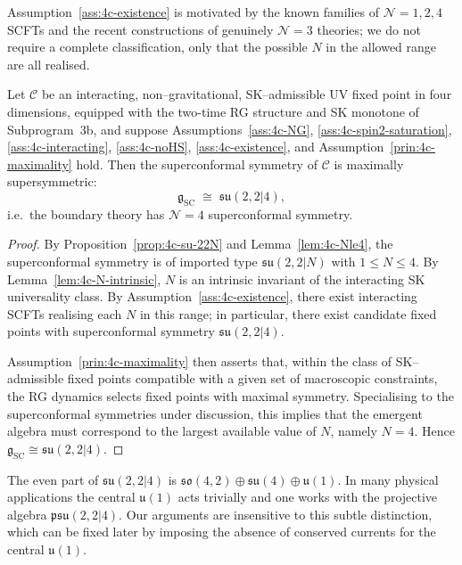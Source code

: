 Assumption~\ref{ass:4c-existence} is motivated by the known families of
$\mathcal N=1,2,4$ SCFTs and the recent constructions of genuinely
$\mathcal N=3$ theories; we do not require a complete classification,
only that the possible $N$ in the allowed range are all realised.

\begin{proposition}[Maximal supersymmetry: \(N=4\)]
\label{prop:4c-N-equals-4}
Let \(\mathcal C\) be an interacting, non–gravitational, SK–admissible
UV fixed point in four dimensions, equipped with the two-time RG
structure and SK monotone of Subprogram~3b, and suppose
Assumptions~\ref{ass:4c-NG}, \ref{ass:4c-spin2-saturation},
\ref{ass:4c-interacting}, \ref{ass:4c-noHS},
\ref{ass:4c-existence}, and
Assumption~\ref{prin:4c-maximality} hold.
Then the superconformal symmetry of \(\mathcal C\) is maximally
supersymmetric:
\begin{equation}
  \mathfrak g_{\mathrm{SC}} \;\cong\; \mathfrak{su}(2,2|4),
\end{equation}
i.e.\ the boundary theory has \(\mathcal N=4\) superconformal symmetry.
\end{proposition}

\begin{proof}
By Proposition~\ref{prop:4c-su-22N} and Lemma~\ref{lem:4c-Nle4}, the
superconformal symmetry is of imported type \(\mathfrak{su}(2,2|N)\) with
\(1\le N\le4\).  By Lemma~\ref{lem:4c-N-intrinsic}, \(N\) is an intrinsic
invariant of the interacting SK universality class.  By
Assumption~\ref{ass:4c-existence}, there exist interacting SCFTs
realising each \(N\) in this range; in particular, there exist candidate
fixed points with superconformal symmetry \(\mathfrak{su}(2,2|4)\).

Assumption~\ref{prin:4c-maximality} then asserts that, within the class
of SK–admissible fixed points compatible with a given set of macroscopic
constraints, the RG dynamics selects fixed points with maximal symmetry.
Specialising to the superconformal symmetries under discussion, this
implies that the emergent algebra must correspond to the largest
available value of \(N\), namely \(N=4\).  Hence
\(\mathfrak g_{\mathrm{SC}}\cong\mathfrak{su}(2,2|4)\).
\end{proof}

\begin{remark}
\label{rmk:4c-psu}
The even part of \(\mathfrak{su}(2,2|4)\) is
\(\mathfrak{so}(4,2)\oplus\mathfrak{su}(4)\oplus\mathfrak u(1)\).  In
many physical applications the central \(\mathfrak u(1)\) acts trivially
and one works with the projective algebra
\(\mathfrak{psu}(2,2|4)\).  Our arguments are insensitive to this subtle
distinction, which can be fixed later by imposing the absence of
conserved currents for the central \(\mathfrak u(1)\).
\end{remark}

